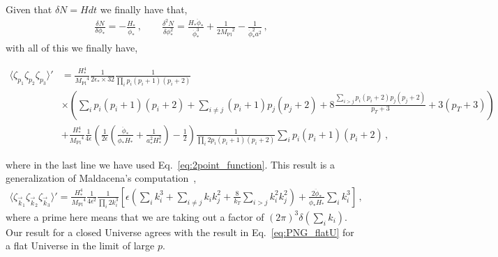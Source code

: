\documentclass[a4paper,11pt]{article}
\numberwithin{equation}{section}
\newcommand{\mpl}{{M_{\mathrm{Pl}}}}
\def\k{{\vec{k}}}
\numberwithin{equation}{section}
\begin{document}
Given that $\delta N=H dt$ we finally have  that,
\begin{align}
\frac{\delta N}{\delta \phi_*}=-\frac{H_*}{\dot\phi_*} \,,\qquad \frac{\delta^2 N}{\delta\phi_*^2}=\frac{H_*\ddot \phi_*}{\dot\phi^3_*}+\frac{1}{2\mpl^2}-\frac{1}{\dot\phi_*^2 a^2} \,,
\end{align} with all of this we finally have,
\begin{small}
\begin{align}
\label{eq:closedBispectrum2V}
\langle \zeta_{p_1}\zeta_{p_2}\zeta_{p_3}\rangle'&=\frac{H_*^4}{\mpl^4}\frac{1}{2\epsilon_*\times 32}\frac{1}{\prod_{i}p_i(p_i+1)(p_i+2)}\\
&\times\left(\sum_i p_i(p_i+1)(p_i+2)+\sum_{i\neq j}(p_i+1)p_j(p_j+2)+8\frac{\sum_{i>j}p_i(p_i+2)p_j(p_j+2)}{p_T+3}+3(p_T+3)\right) \nonumber\\
&+\frac{H_*^4}{\mpl^4}\frac{1}{4\epsilon}\left(\frac{1}{2\epsilon}\left(\frac{\ddot \phi_*}{\dot\phi_*H_*}+\frac{1}{a_*^2 H_*^2}\right)-\frac{1}{2}\right)\frac{1}{\prod_i 2p_i(p_i+1)(p_i+2)}\sum_i p_i(p_i+1)(p_i+2) \,,\nonumber
\end{align}
\end{small}
where in the last line we have used Eq.~\eqref{eq:2point_function}. 
This result is a generalization of Maldacena's computation~\cite{Maldacena:2002vr}, 
\begin{align}
\langle\zeta_{\k_1}\zeta_{\k_2}\zeta_{\k_3}\rangle'=\frac{H^4_*}{\mpl^4}\frac{1}{4\epsilon^2}\frac{1}{\prod_i 2k_i^3}\left[\epsilon\left(\sum_i k_i^3+\sum_{i\neq j}k_ik_j^2+\frac{8}{k_T}\sum_{i>j}k_i^2 k_j^2\right)+\frac{2\ddot\phi_*}{\dot\phi_* H_*}\sum_i k_i^3\right] \,,
\label{eq:PNG_flatU}
\end{align}
where a prime here means that we are taking out a factor of $(2\pi)^3\delta(\sum_i k_i)$. Our result for a closed Universe agrees with the result in Eq.~\eqref{eq:PNG_flatU} for a flat Universe in the limit of large $p$. 
\end{document}
